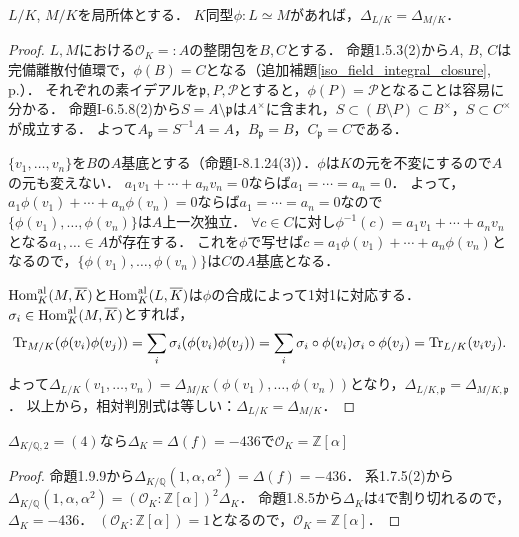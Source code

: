 \begin{screen}
  \begin{lem}
    \label{LF_iso_relative_disc}
    $L/K$, $M/K$を局所体とする．
    $K$同型$\phi\colon L\simeq M$があれば，$\varDelta_{L/K} = \varDelta_{M/K}$．
  \end{lem}
\end{screen}
\begin{proof}
  $L, M$における$\mathcal{O}_K =: A$の整閉包を$B, C$とする．
  命題1.5.3(2)から$A$, $B$, $C$は完備離散付値環で，$\phi(B)=C$となる（追加補題\ref{iso_field_integral_closure}, p.\pageref{iso_field_integral_closure}）．
  それぞれの素イデアルを$\mathfrak{p}, P, \mathcal{P}$とすると，$\phi(P)=\mathcal{P}$となることは容易に分かる．
  命題I-6.5.8(2)から$S=A\setminus\mathfrak{p}$は$A^\times$に含まれ，$S \subset (B \setminus P) \subset B^\times$，$S\subset C^\times$が成立する．
  よって$A_\mathfrak{p} = S^{-1}A = A$，$B_\mathfrak{p} = B$，$C_\mathfrak{p} = C$である．

  $\{v_1, \ldots, v_n\}$を$B$の$A$基底とする（命題I-8.1.24(3)）．$\phi$は$K$の元を不変にするので$A$の元も変えない．
  $a_1v_1+\cdots+a_nv_n=0$ならば$a_1=\cdots=a_n=0$．
  よって，$a_1\phi(v_1)+\cdots+a_n\phi(v_n)=0$ならば$a_1=\cdots=a_n=0$なので$\{\phi(v_1), \ldots, \phi(v_n)\}$は$A$上一次独立．
  $\forall c\in C$に対し$\phi^{-1}(c)=a_1v_1+\cdots+a_nv_n$となる$a_1, \ldots\in A$が存在する．
  これを$\phi$で写せば$c=a_1\phi(v_1)+\cdots+a_n\phi(v_n)$となるので，$\{\phi(v_1), \ldots, \phi(v_n)\}$は$C$の$A$基底となる．

  $\operatorname{Hom}_K^\text{al}(M, \overline{K})$と$\operatorname{Hom}_K^\text{al}(L, \overline{K})$は$\phi$の合成によって1対1に対応する．
  $\sigma_i \in \operatorname{Hom}_K^\text{al}(M, \overline{K})$とすれば，
  \[\operatorname{Tr}_{M/K}(\phi(v_i)\phi(v_j))=\sum_i\sigma_i(\phi(v_i)\phi(v_j))=\sum_i\sigma_i\circ\phi(v_i)\sigma_i\circ\phi(v_j)=\operatorname{Tr}_{L/K}(v_iv_j).\]
  よって$\varDelta_{L/K}(v_1, \ldots, v_n)=\varDelta_{M/K}(\phi(v_1), \ldots, \phi(v_n))$となり，$\varDelta_{L/K, \mathfrak{p}}=\varDelta_{M/K, \mathfrak{p}}$．
  以上から，相対判別式は等しい：$\varDelta_{L/K}=\varDelta_{M/K}$．
\end{proof}

\begin{screen}
  $\varDelta_{K/\mathbb{Q}, 2}=(4)$なら$\varDelta_K=\varDelta(f)=-436$で$\mathcal{O}_K = \mathbb{Z}[\alpha]$
\end{screen}
\begin{proof}
  命題1.9.9から$\varDelta_{K/\mathbb{Q}}(1, \alpha, \alpha^2) = \varDelta(f) = -436$．
  系1.7.5(2)から$\varDelta_{K/\mathbb{Q}}(1, \alpha, \alpha^2) = (\mathcal{O}_K:\mathbb{Z}[\alpha])^2\varDelta_K$．
  命題1.8.5から$\varDelta_K$は$4$で割り切れるので，$\varDelta_K = -436$．
  $(\mathcal{O}_K:\mathbb{Z}[\alpha]) = 1$となるので，$\mathcal{O}_K = \mathbb{Z}[\alpha]$．
\end{proof}

